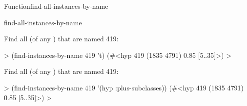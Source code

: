 \documentclass[10pt,twoside,english,pdftex]{article}
\begin{document}
\begin{functiondoc}{Function}{find-all-instances-by-name}
\begin{alsos}{find-all-instances-by-name}
\end{alsos}

\fnexamples
Find all  (of any ) that are named
419:
%
\W\supp
\begin{example}
  > (find-instances-by-name 419 't)
  (#<hyp 419 (1835 4791) 0.85 [5..35]>)
  >
\end{example}
%
Find all  (of any ) that are named
419:
%
\W\supp\notpretop
\begin{example}
  > (find-instances-by-name 419 '(hyp :plus-subclasses))
  (#<hyp 419 (1835 4791) 0.85 [5..35]>)
  >
\end{example}

\end{functiondoc}

\end{document}
